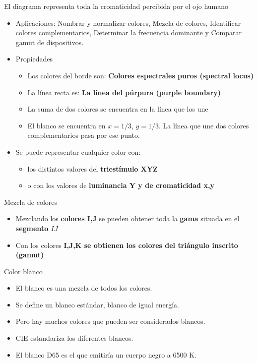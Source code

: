 El diagrama representa toda la cromaticidad percibida por el ojo humano
\begin{itemize}
    \item Aplicaciones: Nombrar y normalizar colores, Mezcla de colores, Identificar colores complementarios, Determinar la frecuencia dominante y Comparar gamut de dispositivos.
    \item Propiedades
    \begin{itemize}
        \item Los colores del borde son: \textbf{Colores espectrales puros (spectral locus)}
        \item La línea recta es: \textbf{La línea del púrpura (purple boundary)}
        \item La suma de dos colores se encuentra en la línea que los une
        \item El blanco se encuentra en $x=1/3$, $y=1/3$. La línea que une dos colores complementarios pasa por ese punto.
    \end{itemize}
    \item Se puede representar cualquier color con:
    \begin{itemize}
        \item los distintos valores del \textbf{triestímulo XYZ}
        \item o con los valores de \textbf{luminancia Y y de cromaticidad x,y}
    \end{itemize}
\end{itemize}

Mezcla de colores
\begin{itemize}
    \item Mezclando los \textbf{colores I,J} se pueden obtener toda la \textbf{gama} situada en el \textbf{segmento $\overline{IJ}$}
    \item Con los colores \textbf{I,J,K se obtienen los colores del triángulo inscrito (gamut)}
\end{itemize}
\pagebreak

Color blanco
\begin{itemize}
    \item El blanco es una mezcla de todos los colores.
    \item Se define un blanco estándar, blanco de igual energía.
    \item Pero hay muchos colores que pueden ser considerados blancos.
    \item CIE estandariza los diferentes blancos.
    \item El blanco D65 es el que emitiría un cuerpo negro a 6500 K.
\end{itemize}